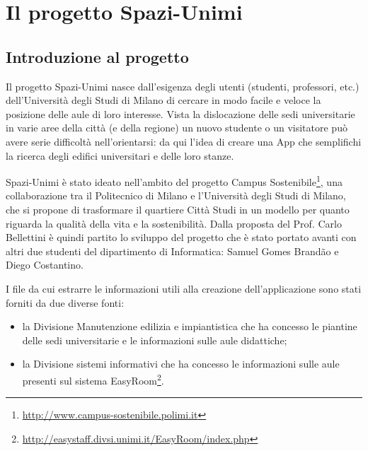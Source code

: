 \documentclass[12pt]{report}
\begin{document}
%
%



\afterpreface
% 
% 
\chapter{Il progetto Spazi-Unimi}
\label{Spazi-Unimi}

\section{Introduzione al progetto}

Il progetto Spazi-Unimi nasce dall’esigenza degli utenti (studenti, professori, etc.) dell’Università degli Studi di Milano di cercare in modo facile e veloce la posizione delle aule di loro interesse. 
Vista la dislocazione delle sedi universitarie in varie aree della città (e della regione) un nuovo studente o un visitatore può avere serie difficoltà nell’orientarsi: da qui l’idea di creare una App che semplifichi la ricerca degli edifici universitari e delle loro stanze. 

Spazi-Unimi è stato ideato nell’ambito del progetto Campus Sostenibile\footnote{\url{http://www.campus-sostenibile.polimi.it}}, una collaborazione tra il Politecnico di Milano e l’Università degli Studi di Milano, che si propone di trasformare il quartiere Città Studi in un modello per quanto riguarda la qualità della vita e la sostenibilità.
Dalla proposta del Prof. Carlo Bellettini è quindi partito lo sviluppo del progetto che è stato portato avanti con altri due studenti del dipartimento di Informatica: Samuel Gomes Brandão e Diego Costantino.

\vspace{5mm} %

I file da cui estrarre le informazioni utili alla creazione dell'applicazione sono stati forniti da due diverse fonti:
\begin{itemize}
\item la Divisione Manutenzione edilizia e impiantistica che ha concesso le piantine delle sedi universitarie e le informazioni sulle aule didattiche;
\item la Divisione sistemi informativi che ha concesso le informazioni sulle aule presenti sul sistema EasyRoom\footnote{\url{http://easystaff.divsi.unimi.it/EasyRoom/index.php}}.
\end{itemize}

\vspace{5mm} %
\end{document}
